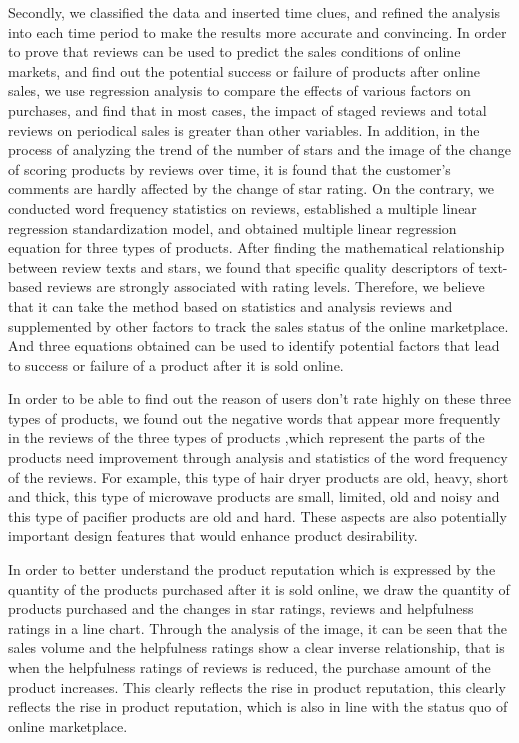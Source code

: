 \documentclass[12pt]{article}
\begin{document}
\par
Secondly, we classified the data and inserted time clues, and refined the analysis into each time period to make the results more accurate and convincing. In order to prove that reviews can be used to predict the sales conditions of online markets, and find out the potential success or failure of products after online sales, we use regression analysis to compare the effects of various factors on purchases, and find that in most cases, the impact of staged reviews and total reviews on periodical sales is greater than other variables. In addition, in the process of analyzing the trend of the number of stars and the image of the change of scoring products by reviews over time, it is found that the customer's comments are hardly affected by the change of star rating. On the contrary, we conducted word frequency statistics on reviews, established a multiple linear regression standardization model, and obtained multiple linear regression equation for three types of products. After finding the mathematical relationship between review texts and stars, we found that specific quality descriptors of text-based reviews are strongly associated with rating levels. Therefore, we believe that it can take the method based on statistics and analysis reviews and supplemented by other factors to track the sales status of the online marketplace. And three equations obtained can be used to identify potential factors that lead to success or failure of a product after it is sold online.
\par
In order to be able to find out the reason of users don’t rate highly on these three types of products, we found out the negative words that appear more frequently in the reviews of the three types of products ,which represent the parts of the products need improvement through analysis and statistics of the word frequency of the reviews. For example, this type of hair dryer products are old, heavy, short and thick, this type of microwave products are small, limited, old and noisy and this type of pacifier products are old and hard. These aspects are also potentially important design features that would enhance product desirability.
\par
In order to better understand the product reputation which is expressed by the quantity of the products purchased after it is sold online, we draw the quantity of products purchased and the changes in star ratings, reviews and helpfulness ratings in a line chart. Through the analysis of the image, it can be seen that the sales volume and the helpfulness ratings show a clear inverse relationship, that is when the helpfulness ratings of reviews is reduced, the purchase amount of the product increases. This clearly reflects the rise in product reputation, this clearly reflects the rise in product reputation, which is also in line with the status quo of online marketplace.
\end{document}
